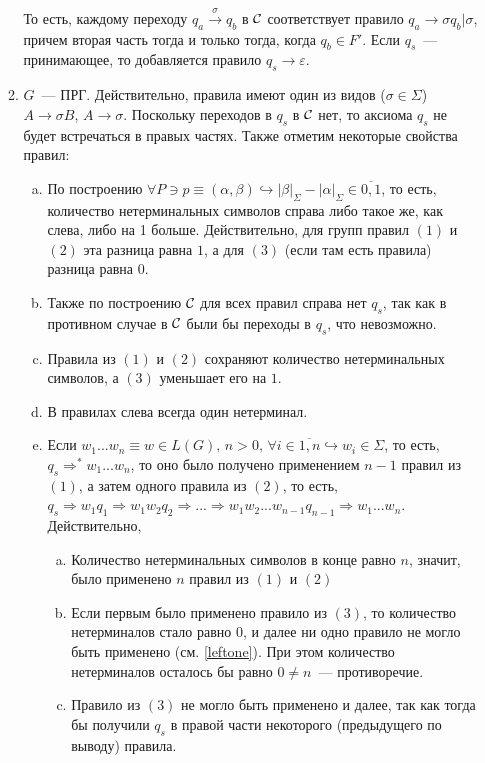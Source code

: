 \documentclass[a4paper]{article}
\def\C{{\cal C}}
\begin{document}
\begin{enumerate}
\begin{enumerate}[1.]
То есть, каждому переходу $q_a\overset{\sigma}{\longrightarrow}q_b$ в $\C$ соответствует правило $q_a\longrightarrow\sigma q_b\big|\sigma$, причем вторая часть тогда и только тогда, когда $q_b\in F'$. Если $q_s$~--- принимающее, то добавляется правило $q_s\longrightarrow\varepsilon$.
\item $G$~--- ПРГ. Действительно, правила имеют один из видов ($\sigma\in\Sigma$) $A\longrightarrow\sigma B$, $A\longrightarrow\sigma$. Поскольку переходов в $q_s$ в $\C$ нет, то аксиома $q_s$ не будет встречаться в правых частях.
\newline
Также отметим некоторые свойства правил:\begin{enumerate}[a.]
\item По построению $\forall P\ni p\equiv(\alpha,\beta)\hookrightarrow |\beta|_\Sigma-|\alpha|_\Sigma\in\overline{0,1}$, то есть, количество нетерминальных символов справа либо такое же, как слева, либо на 1 больше. Действительно, для групп правил $(1)$ и $(2)$ эта разница равна $1$, а для $(3)$ (если там есть правила) разница равна $0$.
\item Также по построению $\C$ для всех правил справа нет $q_s$, так как в противном случае в $\C$ были бы переходы в $q_s$, что невозможно.
\item Правила из $(1)$ и $(2)$ сохраняют количество нетерминальных символов, а $(3)$ уменьшает его на $1$.
\item \label{leftone} В правилах слева всегда один нетерминал.
\item \label{w1wninLGthen} Если $w_1...w_n\equiv w\in L(G),\,n>0,\,\forall i\in\overline{1,n}\hookrightarrow w_i\in\Sigma$, то есть, $q_s\Longrightarrow^*w_1...w_n$, то оно было получено применением $n-1$ правил из $(1)$, а затем одного правила из $(2)$, то есть, $q_s\Longrightarrow w_1q_1\Longrightarrow w_1w_2q_2\Longrightarrow...\Longrightarrow w_1w_2...w_{n-1}q_{n-1}\Longrightarrow w_1...w_n$.\newline
Действительно,\begin{enumerate}[a.]
\item \label{sum12} Количество нетерминальных символов в конце равно $n$, значит, было применено $n$ правил из $(1)$ и $(2)$
\item \label{thirdfirst} Если первым было применено правило из $(3)$, то количество нетерминалов стало равно $0$, и далее ни одно правило не могло быть применено (см. \ref{leftone}). При этом количество нетерминалов осталось бы равно $0\neq n$~--- противоречие.
\item \label{thirdnotfirst} Правило из $(3)$ не могло быть применено и далее, так как тогда бы получили $q_s$ в правой части некоторого (предыдущего по выводу) правила.

\end{enumerate}
\end{enumerate}
\end{enumerate}
\end{enumerate}
\end{document}
